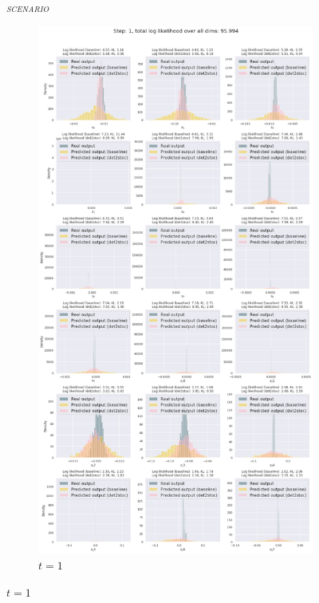 \begin{figure}
\centering
\emph{\textsc{\MakeLowercase{\ws{} scenario}}}
\begin{subfigure}{\textwidth}
    \includegraphics[trim=0 1650 0 50,clip,width=1.0\textwidth]
    {img/windyslope/output/output_distribution_step1_delta_all}
    \caption{$t=1$}
    \label{fig:output_distribution_step1_posvel_dettostoc}

\end{subfigure}
\end{figure}
